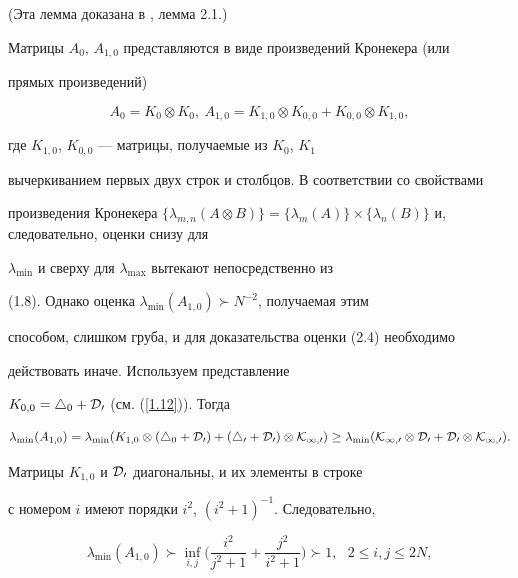 \begin{pf} (Эта лемма доказана в \cite{iva-kor2}, лемма 2.1.)


Матрицы $A_0$, $A_{1,0}$ представляются в виде произведений Кронекера (или


прямых произведений)


$$


A_0=K_0\otimes K_0,\


A_{1,0}=K_{1,0}\otimes K_{0,0}+ K_{0,0}\otimes K_{1,0},


$$


где $K_{1,0}$, $K_{0,0}$ --- матрицы, получаемые из $K_0$, $K_1$


вычеркиванием первых двух строк и столбцов. В соответствии со свойствами


произведения Кронекера $\{\lambda_{m,n}(A\otimes B)\}=\{\lambda_m(A)\}


\times\{\lambda_n(B)\}$ и, следовательно, оценки снизу для


$\lambda_{\min}$ и сверху для $\lambda_{\max}$ вытекают непосредственно из


(1.8). Однако оценка $\lambda_{\min}(A_{1,0})\succ N^{-2}$, получаемая этим


способом, слишком груба, и для доказательства оценки (2.4) необходимо


действовать иначе. Используем представление


$K_{0,0}=\bigtriangleup_{0}+\cal D_0$ (см. (\ref{1.12})). Тогда


$$


\lambda_{\min}(A_{1,0})=\lambda_{\min}


(K_{1,0}\otimes(\bigtriangleup_0+\cal D_0)+


(\bigtriangleup_0+\cal D_0)\otimes K_{1,0})


\ge\lambda_{\min}(K_{1,0}\otimes\cal D_0+


\cal D_0\otimes K_{1,0}).


$$


Матрицы $K_{1,0}$ и $\cal D_0$ диагональны, и их элементы в строке


с номером $i$ имеют порядки $i^2$, $(i^2+1)^{-1}$. Следовательно,


\begin{equation}


\lambda_{\min}(A_{1,0})


\succ\underset{i,j}{\inf}{}


\bigg(\frac{i^2}{j^2+1}+\frac{j^2}{i^2+1}\bigg)\succ1,\ \ \


2\le i,j \le 2N,



\end{equation}
\end{pf}
